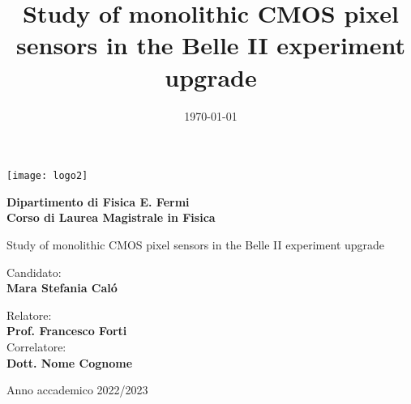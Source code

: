 \documentclass[10pt,a4paper]{report}
\title{Study of monolithic CMOS pixel sensors in the Belle II experiment upgrade}
\date{\today}
\begin{document}
\begin{titlepage}
    \begin{center}
        \texttt{[image: logo2]}
        \vspace*{1.2cm}

        \LARGE

        \textbf{ \large Dipartimento di Fisica E. Fermi \\ Corso di Laurea Magistrale in Fisica}

        \vspace*{2.5cm}
        
        \huge
        Study of monolithic CMOS pixel sensors in the Belle II experiment upgrade

        \normalsize
        \vspace*{4cm}

        
        
        \begin{minipage}[t]{0.47\textwidth}
	       {Candidato:} \hspace{-0.9em} \vspace{0.3em} \\
              {\large \textbf{Mara Stefania Caló}} %
        \end{minipage}
        \hfill
        \begin{minipage}[t]{0.47\textwidth}\raggedleft
	       {Relatore:} \vspace{0.3em} \\
              {\large \textbf{Prof. Francesco Forti}} \vspace{1em}  \\
              {Correlatore:} \vspace{0.3em} \\
              {\large \textbf{Dott. Nome Cognome}}
        \end{minipage}

        \vfill
        Anno accademico 2022/2023
            
    \end{center}
\end{titlepage}




\doublespacing
\tableofcontents
\singlespacing
\end{document}
